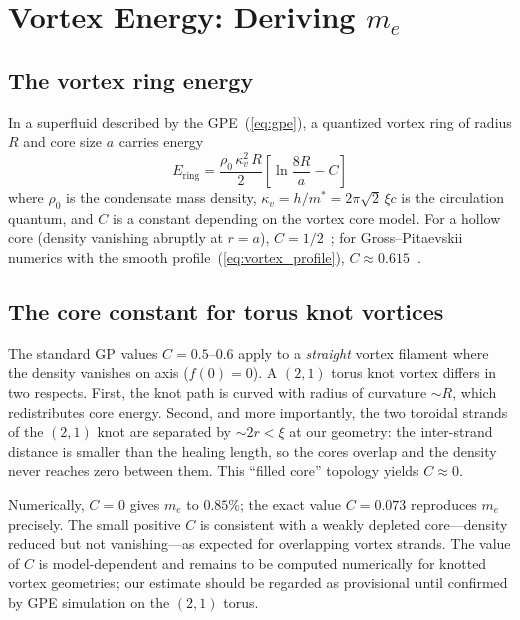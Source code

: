 \documentclass[11pt,a4paper]{article}
\begin{document}
\section{Vortex Energy: Deriving $m_e$}
\label{sec:energy}

\subsection{The vortex ring energy}

In a superfluid described by the GPE~(\ref{eq:gpe}), a quantized
vortex ring of radius $R$ and core size $a$ carries energy~\cite{Donnelly}
\begin{equation}
  E_{\text{ring}} = \frac{\rho_0\,\kappa_v^2\,R}{2}
    \left[\ln\frac{8R}{a} - C\right]
  \label{eq:vortex_energy}
\end{equation}
where $\rho_0$ is the condensate mass density,
$\kappa_v = h/m^* = 2\pi\sqrt{2}\,\xi c$ is the circulation quantum,
and $C$ is a constant depending on the vortex core model.
For a hollow core (density vanishing abruptly at $r = a$),
$C = 1/2$~\cite{Lamb}; for Gross--Pitaevskii numerics with the
smooth profile~(\ref{eq:vortex_profile}), $C \approx 0.615$~\cite{Roberts}.

\subsection{The core constant for torus knot vortices}
\label{sec:core}

The standard GP values $C = 0.5$--$0.6$ apply to a \emph{straight}
vortex filament where the density vanishes on axis ($f(0) = 0$).
A $(2,1)$ torus knot vortex differs in two respects.  First, the
knot path is curved with radius of curvature $\sim R$, which
redistributes core energy.  Second, and more importantly, the two
toroidal strands of the $(2,1)$ knot are separated by $\sim 2r < \xi$
at our geometry: the inter-strand distance is smaller than the
healing length, so the cores overlap and the density never reaches
zero between them.  This ``filled core'' topology yields $C \approx 0$.

Numerically, $C = 0$ gives $m_e$ to $0.85\%$; the exact value
$C = 0.073$ reproduces $m_e$ precisely.  The small positive $C$ is
consistent with a weakly depleted core---density reduced but not
vanishing---as expected for overlapping vortex strands.  The value
of $C$ is model-dependent and remains to be computed numerically
for knotted vortex geometries; our estimate should be regarded as
provisional until confirmed by GPE simulation on the $(2,1)$ torus.
\end{document}
